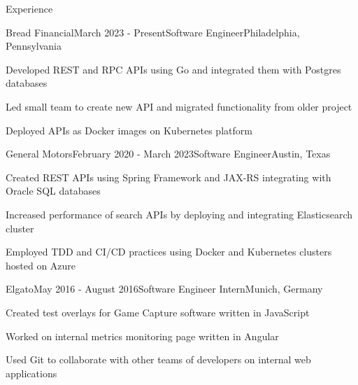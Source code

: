 \documentclass[
	11pt, %
]{resume} %
\begin{document}
\begin{rSection}{Experience}

	\begin{rSubsection}{Bread Financial}{March 2023 - Present}{Software Engineer}{Philadelphia, Pennsylvania}
		\item Developed REST and RPC APIs using Go and integrated them with Postgres databases
		\item Led small team to create new API and migrated functionality from older project
		\item Deployed APIs as Docker images on Kubernetes platform
	\end{rSubsection}


	\begin{rSubsection}{General Motors}{February 2020 - March 2023}{Software Engineer}{Austin, Texas}
		\item Created REST APIs using Spring Framework and JAX-RS integrating with Oracle SQL databases
		\item Increased performance of search APIs by deploying and integrating Elasticsearch cluster
		\item Employed TDD and CI/CD practices using Docker and Kubernetes clusters hosted on Azure
	\end{rSubsection}


	\begin{rSubsection}{Elgato}{May 2016 - August 2016}{Software Engineer Intern}{Munich, Germany}
		\item Created test overlays for Game Capture software written in JavaScript
		\item Worked on internal metrics monitoring page written in Angular
		\item Used Git to collaborate with other teams of developers on internal web applications
	\end{rSubsection}

\end{rSection}
\end{document}
